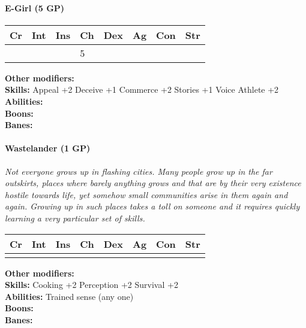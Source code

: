 \documentclass[12pt,a4paper,openany]{book}
\begin{document}
	\paragraph*{E-Girl (5 GP)}
	\textit{}\par
	\begin{tabular}{|l|l|l|l|l|l|l|l|}
		\hline
		Cr & Int & Ins & Ch & Dex & Ag & Con & Str \\ \hline
		&  &  & 5 &  &  &  &  \\ \hline
	\end{tabular}\par
	\noindent\textbf{Other modifiers:} \\
	\textbf{Skills:} Appeal +2
	Deceive +1
	Commerce +2
	Stories +1
	Voice Athlete +2\\
	\textbf{Abilities:} \\
	\textbf{Boons:} \\
	\textbf{Banes:} \\
	
	\hrulefill
	\paragraph*{Wastelander (1 GP)}
	\textit{Not everyone grows up in flashing cities. Many people grow up in the far outskirts, places where barely anything grows and that are by their very existence hostile towards life, yet somehow small communities arise in them again and again. 
		Growing up in such places takes a toll on someone and it requires quickly learning a very particular set of skills.}\par
	\begin{tabular}{|l|l|l|l|l|l|l|l|}
		\hline
		Cr & Int & Ins & Ch & Dex & Ag & Con & Str \\ \hline
		&  &  &  &  &  &  &  \\ \hline
	\end{tabular}\par
	\noindent\textbf{Other modifiers:} \\
	\textbf{Skills:} Cooking +2
	Perception +2
	Survival +2\\
	\textbf{Abilities:} Trained sense (any one)\\
	\textbf{Boons:} \\
	\textbf{Banes:} \\
	
	\hrulefill
\end{document}
